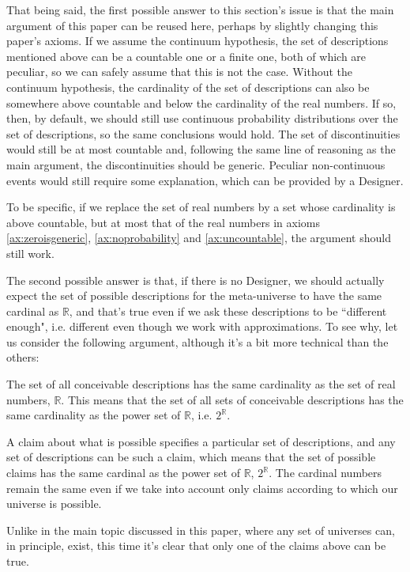 \documentclass[a4paper
,draft
]{article}
\def\reale{\mathbb{R}}
\newcommand{\paper}[1]{paper}
\newcommand{\ghilimele}[1]{``#1"}
\begin{document}
That being said, the first possible answer to this section's issue
is that the main argument of this \paper{} can be reused here,
perhaps by slightly changing this \paper{}'s
axioms.
If we assume the continuum hypothesis, the set of descriptions mentioned
above can be a countable one or a finite one, both of which are peculiar,
so we can safely assume that this is not the case.
Without the continuum hypothesis, the cardinality of the set of descriptions
can also be somewhere above countable and below the cardinality of
the real numbers.
If so, then, by default, we should still use continuous
probability distributions over the set of descriptions, so the same conclusions
would hold.
The set of discontinuities would still be at most countable and,
following the same line of reasoning as the main argument, the discontinuities
should be generic.
Peculiar non-continuous events would still require some explanation,
which can be provided by a Designer.

To be specific, if we replace the set of real numbers by a set whose
cardinality is above countable, but at most that of the real numbers
in axioms \ref{ax:zeroisgeneric}, \ref{ax:noprobability} and
\ref{ax:uncountable}, the argument should still work.

The second possible answer is that, if there is no Designer, we should actually
expect the set of
possible descriptions for the meta-universe to have the same cardinal as
$\reale$, and that's true even
if we ask these descriptions to be \ghilimele{different enough},
i.e. different even though we work with approximations.
To see why, let us consider the following argument, although it's a bit more
technical than the others:

The set of all conceivable descriptions has the same cardinality as the
set of real numbers, $\reale$. This means that the
set of all sets of conceivable descriptions
has the same cardinality as the power set of $\reale$, i.e. $2^\reale$.

A claim about what is possible specifies a particular set of descriptions,
and any set of descriptions can be such a claim,
which means that the set of possible claims has the same cardinal as
the power set of $\reale$, $2^\reale$.
The cardinal numbers remain the same even if we take into account only claims
according to which our universe is possible.

Unlike in the main topic discussed in this
\paper{}, where any set of universes can, in principle, exist,
this time it's clear that only one of the claims above can be true.
\end{document}
